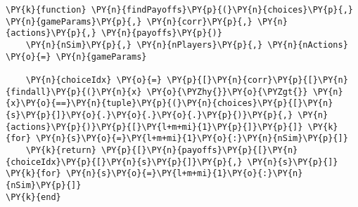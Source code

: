 \documentclass[main.tex]{subfiles}
\begin{document}
    \begin{tcolorbox}[breakable, size=fbox, boxrule=1pt, pad at break*=1mm,colback=cellbackground, colframe=cellborder]
\begin{Verbatim}[commandchars=\\\{\}]
\PY{k}{function} \PY{n}{findPayoffs}\PY{p}{(}\PY{n}{choices}\PY{p}{,} \PY{n}{gameParams}\PY{p}{,} \PY{n}{corr}\PY{p}{,} \PY{n}{actions}\PY{p}{,} \PY{n}{payoffs}\PY{p}{)}
    \PY{n}{nSim}\PY{p}{,} \PY{n}{nPlayers}\PY{p}{,} \PY{n}{nActions} \PY{o}{=} \PY{n}{gameParams}
    
    \PY{n}{choiceIdx} \PY{o}{=} \PY{p}{[}\PY{n}{corr}\PY{p}{[}\PY{n}{findall}\PY{p}{(}\PY{n}{x} \PY{o}{\PYZhy{}}\PY{o}{\PYZgt{}} \PY{n}{x}\PY{o}{==}\PY{n}{tuple}\PY{p}{(}\PY{n}{choices}\PY{p}{[}\PY{n}{s}\PY{p}{]}\PY{o}{.}\PY{o}{.}\PY{o}{.}\PY{p}{)}\PY{p}{,} \PY{n}{actions}\PY{p}{)}\PY{p}{[}\PY{l+m+mi}{1}\PY{p}{]}\PY{p}{]} \PY{k}{for} \PY{n}{s}\PY{o}{=}\PY{l+m+mi}{1}\PY{o}{:}\PY{n}{nSim}\PY{p}{]}
    \PY{k}{return} \PY{p}{[}\PY{n}{payoffs}\PY{p}{[}\PY{n}{choiceIdx}\PY{p}{[}\PY{n}{s}\PY{p}{]}\PY{p}{,} \PY{n}{s}\PY{p}{]} \PY{k}{for} \PY{n}{s}\PY{o}{=}\PY{l+m+mi}{1}\PY{o}{:}\PY{n}{nSim}\PY{p}{]}
\PY{k}{end}
\end{Verbatim}
\end{tcolorbox}
\end{document}
